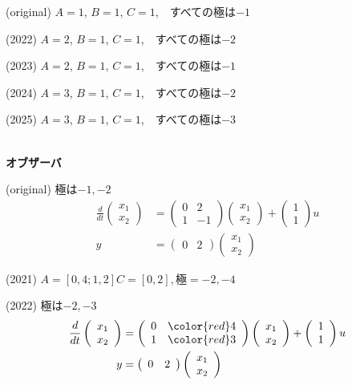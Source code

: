 (original)
$A=1$, $B=1$, $C=1$,　すべての極は$-1$

(2022)
{\color{red}$A=2$}, $B=1$, $C=1$,　すべての極は{\color{red}$-2$}

(2023)
{\color{red}$A=2$}, $B=1$, $C=1$,　すべての極は{\color{red}$-1$}

(2024)
{\color{red}$A=3$}, $B=1$, $C=1$,　すべての極は{\color{red}$-2$}

(2025)
{\color{red}$A=3$}, $B=1$, $C=1$,　すべての極は{\color{red}$-3$}

\ \\ \noindent
{\bf オブザーバ}

(original) 極は$-1, -2$
\begin{align*}
	\frac{d}{dt}
	\left (
	\begin{array}{c}
	 x_1 \\ x_2 
	\end{array}
	\right )
	& = 
	\left (
	\begin{array}{cc}
	 0 & 2 \\
	 1 & -1
	\end{array}
	\right )
	\left (
	\begin{array}{c}
	 x_1 \\ x_2 
	\end{array}
	\right )
	+
	\left (
	\begin{array}{c}
	 1 \\ 1 
	\end{array}
	\right )
	u
\\
	y&=
	\left ( \begin{array}{cc}
		0 & 2 
	\end{array} \right )
	\left (	\begin{array}{c}
		x_1 \\ x_2 
	\end{array} \right )
\end{align*}

(2021) $A=[0,4;1,2] C=[0,2], 極=-2,-4$

(2022) 極は{\color{red}$-2, -3$}
\begin{align*}
	\frac{d}{dt}
	\left (
	\begin{array}{c}
	 x_1 \\ x_2 
	\end{array}
	\right )
	& = 
	\left (
	\begin{array}{cc}
	 0 & {\color{red}4} \\
	 1 & {\color{red}3}
	\end{array}
	\right )
	\left (
	\begin{array}{c}
	 x_1 \\ x_2 
	\end{array}
	\right )
	+
	\left (
	\begin{array}{c}
	 1 \\ 1 
	\end{array}
	\right )
	u
\\
	y&=
	\left ( \begin{array}{cc}
		0 & 2 
	\end{array} \right )
	\left (	\begin{array}{c}
		x_1 \\ x_2 
	\end{array} \right )
\end{align*}

